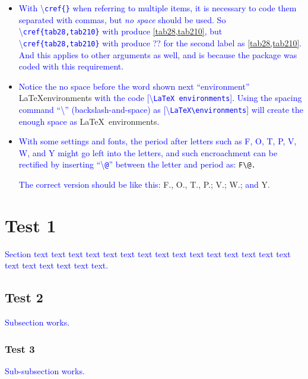 \documentclass[phd,showframe]{ndsu-thesis-2022}
\newcommand\italk[1]{\textcolor{blue}{#1}}  %
\newcommand\cmd[1]{\textbackslash\texttt{#1}}  %
\begin{document}
\begin{itemize}
\item
\italk{With \cmd{cref\{\}} when referring to multiple items, it is necessary to code them separated with commas, but \emph{no space} should be used. So \cmd{cref\{tab28,tab210\}} with produce} \cref{tab28,tab210}\italk{, but \cmd{cref\{tab28,tab210\}} with produce ?? for the second label as } \cref{tab28,tab210}\italk{. And this applies to other arguments as well, and is because the package was coded with this requirement.}

\item
\italk{Notice the no space before the word shown next ``environment''}  \LaTeX environments \italk{with the code [\cmd{LaTeX environments}]. Using the spacing command ``\cmd{\:}'' (backslash-and-space) as [\cmd{LaTeX\textbackslash\:environments}] will create the enough space as} \LaTeX\ environments\italk{.}

\item
\italk{With some settings and fonts, the period after letters such as F, O, T, P, V, W, and Y might go left into the letters, and such encroachment can be rectified by inserting ``\cmd{@}'' between the letter and period as:} {\LARGE{\verb|F\@.|}} 

\italk{The correct version should be like this:} {\LARGE F\@., O\@., T\@., P\@.; V\@.; W\@.;} \italk{and} {\LARGE Y\@.}


\end{itemize}


\section{Test 1}
\italk{Section text text text text text text text text text text text text text text text text text text text text text.}

\subsection{Test 2}
\italk{Subsection works.}

\subsubsection{Test 3}
\italk{Sub-subsection works.} 
\kant[3]
\end{document}
